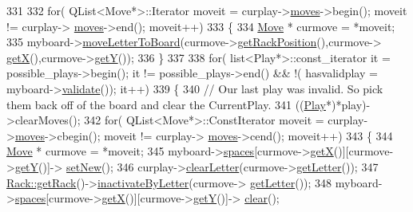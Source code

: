 \begin{DoxyCode}
331 
332         \textcolor{keywordflow}{for}( QList<Move*>::Iterator moveit = curplay->\hyperlink{class_play_ade35ae53bff24e1755a935899ee018ed}{moves}->begin(); moveit != curplay->
      \hyperlink{class_play_ade35ae53bff24e1755a935899ee018ed}{moves}->end(); moveit++)
333         \{
334             \hyperlink{class_move}{Move} * curmove = *moveit;
335             myboard->\hyperlink{class_board_a8ed329bcdb775a910a575161ee5221ac}{moveLetterToBoard}(curmove->\hyperlink{class_move_ad78bb76d9b590cdb98aa4d4a3088e69d}{getRackPosition}(),curmove->
      \hyperlink{class_move_a7e3169f48fcca1aa1de4a5cbe67a284d}{getX}(),curmove->\hyperlink{class_move_af388d15d91f61a1f909998f50988ac1a}{getY}());
336         \}
337 
338         \textcolor{keywordflow}{for}( list<Play*>::const\_iterator it = possible\_plays->begin(); it != possible\_plays->end() && !(
      hasvalidplay = myboard->\hyperlink{class_board_a6f71df81a77438867e79f956afedb141}{validate}()); it++)
339         \{
340             \textcolor{comment}{// Our last play was invalid. So pick them back off of the board and clear the CurrentPlay.}
341             ((\hyperlink{class_play}{Play}*)*play)->clearMoves();
342             \textcolor{keywordflow}{for}( QList<Move*>::ConstIterator moveit = curplay->\hyperlink{class_play_ade35ae53bff24e1755a935899ee018ed}{moves}->cbegin(); moveit != curplay->
      \hyperlink{class_play_ade35ae53bff24e1755a935899ee018ed}{moves}->cend(); moveit++)
343             \{
344                 \hyperlink{class_move}{Move} * curmove = *moveit;
345                 myboard->\hyperlink{class_board_a73b12248ddb6ee3adc24f4458d8661c2}{spaces}[curmove->\hyperlink{class_move_a7e3169f48fcca1aa1de4a5cbe67a284d}{getX}()][curmove->\hyperlink{class_move_af388d15d91f61a1f909998f50988ac1a}{getY}()]->
      \hyperlink{class_space_a3afac453f54e569a94164c41a9721643}{setNew}();
346                 curplay->\hyperlink{class_play_a034c9cc986629045cdfcdbdeaabb2ab4}{clearLetter}(curmove->\hyperlink{class_move_a0c29654c98269d65c6af694eb441d382}{getLetter}());
347                 \hyperlink{class_rack_aa48de650c15bda8267451d84caf6ea3f}{Rack::getRack}()->\hyperlink{class_rack_afdf845eb458b07ed6029d29672ab120f}{inactivateByLetter}(curmove->
      \hyperlink{class_move_a0c29654c98269d65c6af694eb441d382}{getLetter}());
348                 myboard->\hyperlink{class_board_a73b12248ddb6ee3adc24f4458d8661c2}{spaces}[curmove->\hyperlink{class_move_a7e3169f48fcca1aa1de4a5cbe67a284d}{getX}()][curmove->\hyperlink{class_move_af388d15d91f61a1f909998f50988ac1a}{getY}()]->
      \hyperlink{class_space_ab18791c1da302a91c51477108be478b5}{clear}();

\end{DoxyCode}
